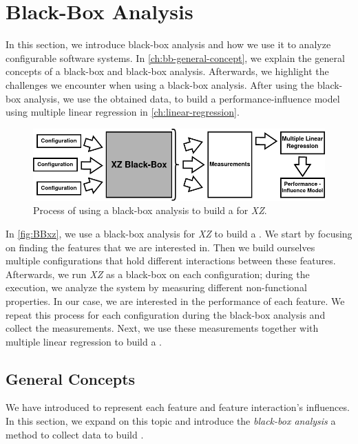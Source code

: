 \section{Black-Box Analysis}\label{ch:Blackbox}
In this section, we introduce black-box analysis and how we use it to analyze configurable software systems. 
In \autoref{ch:bb-general-concept}, we explain the general concepts of a black-box and black-box analysis. 
Afterwards, we highlight the challenges we encounter when using a black-box analysis.
After using the black-box analysis, we use the obtained data, to build a performance-influence model using multiple linear regression in \autoref{ch:linear-regression}.

\begin{figure}[h]
    \centering
    \includegraphics[scale=0.53]{gfx/BlackBox2_0.png}
    \caption{Process of using a black-box analysis to build a {\perfInfluenceModel} for \textit{XZ}.}
    \label{fig:BBxz}
\end{figure}

In \autoref{fig:BBxz}, we use a black-box analysis for \textit{XZ} to build a \perfInfluenceModel.
We start by focusing on finding the features that we are interested in. 
Then we build ourselves multiple configurations that hold different interactions between these features.
Afterwards, we run \textit{XZ} as a black-box on each configuration; during the execution, we analyze the system by measuring different non-functional properties.
In our case, we are interested in the performance of each feature. 
We repeat this process for each configuration during the black-box analysis and collect the measurements.
Next, we use these measurements together with multiple linear regression to build a \perfInfluenceModel.

\subsection{General Concepts}\label{ch:bb-general-concept}

We have introduced {\perfInfluenceModel} to represent each feature and feature interaction's influences. 
In this section, we expand on this topic and introduce the \emph{black-box analysis} a method to collect data to build \perfInfluenceModel.

